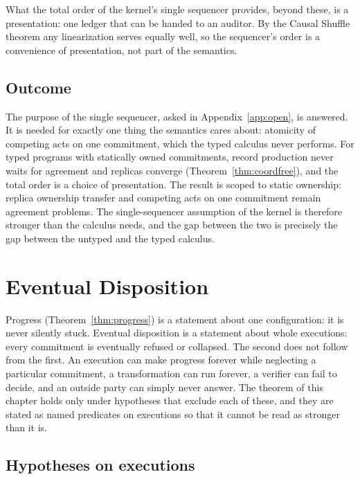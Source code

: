 \documentclass[11pt,openany]{book}
\theoremstyle{remark}
\begin{document}
What the total order of the kernel's single sequencer provides, beyond
these, is a presentation: one ledger that can be handed to an auditor. By
the Causal Shuffle theorem any linearization serves equally well, so the
sequencer's order is a convenience of presentation, not part of the
semantics.

\section{Outcome}

The purpose of the single sequencer, asked in Appendix~\ref{app:open}, is
answered. It is needed for exactly one thing the semantics cares about:
atomicity of competing acts on one commitment, which the typed calculus
never performs. For typed programs with statically owned commitments,
record production never waits for agreement and replicas converge
(Theorem~\ref{thm:coordfree}), and the total order is a choice of
presentation. The result is scoped to static ownership: replica
ownership transfer and competing acts on one commitment remain agreement
problems. The single-sequencer assumption
of the kernel is therefore stronger than the calculus needs, and the gap
between the two is precisely the gap between the untyped and the typed
calculus.

\chapter{Eventual Disposition}
\label{ch:progress}

Progress (Theorem~\ref{thm:progress}) is a statement about one
configuration: it is never silently stuck. Eventual disposition is a
statement about whole executions: every commitment is eventually refused
or collapsed. The second does not follow from the first. An execution can
make progress forever while neglecting a particular commitment, a
transformation can run forever, a verifier can fail to decide, and an
outside party can simply never answer. The theorem of this chapter holds
only under hypotheses that exclude each of these, and they are stated as
named predicates on executions so that it cannot be read as stronger than
it is.

\section{Hypotheses on executions}
\end{document}
